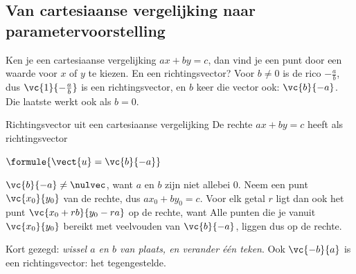 
\begin{oefeningen}
\end{oefeningen}

\subsection{Van cartesiaanse vergelijking naar parametervoorstelling}

Ken je een cartesiaanse vergelijking $ax + by = c$, dan vind je een punt door een waarde voor $x$ of $y$ te kiezen. En een richtingsvector? Voor $b \neq 0$ is de rico $-\tfrac{a}{b}$, dus $\vc{1}{-\tfrac{a}{b}}$ is een richtingsvector, en $b$ keer die vector ook: $\vc{b}{-a}$. Die laatste werkt ook als $b = 0$.

\begin{theorie}
\begin{stelling}{Richtingsvector uit een cartesiaanse vergelijking}
De rechte $ax + by = c$ heeft als richtingsvector

\vspace{1mm}
\qquad $\formule{\vect{u} = \vc{b}{-a}}$
\end{stelling}
\begin{bewijs}
$\vc{b}{-a} \neq \nulvec$, want $a$ en $b$ zijn niet allebei $0$. Neem een punt $\vc{x_0}{y_0}$ van de rechte, dus $ax_0 + by_0 = c$. Voor elk getal $r$ ligt dan ook het punt $\vc{x_0 + rb}{y_0 - ra}$ op de rechte, want
Alle punten die je vanuit $\vc{x_0}{y_0}$ bereikt met veelvouden van $\vc{b}{-a}$, liggen dus op de rechte.
\end{bewijs}
\end{theorie}

Kort gezegd: \textit{wissel $a$ en $b$ van plaats, en verander één teken}. Ook $\vc{-b}{a}$ is een richtingsvector: het tegengestelde.

